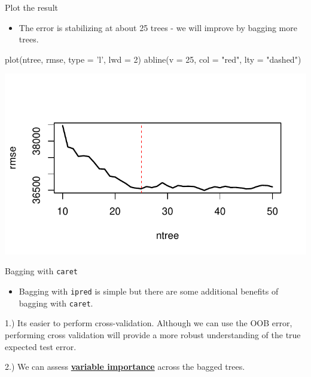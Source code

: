 \documentclass[
  10pt,
  ignorenonframetext,
]{beamer}
\newenvironment{Shaded}{}{}
\newcommand{\DataTypeTok}[1]{#1}
\newcommand{\DecValTok}[1]{#1}
\newcommand{\KeywordTok}[1]{\textcolor[rgb]{0.00,0.00,1.00}{#1}}
\newcommand{\NormalTok}[1]{#1}
\newcommand{\StringTok}[1]{\textcolor[rgb]{0.00,0.50,0.50}{#1}}
\providecommand{\tightlist}{%
  \setlength{\itemsep}{0pt}\setlength{\parskip}{0pt}}
\begin{document}
\begin{frame}[fragile]{Plot the result}
\protect\hypertarget{plot-the-result-1}{}

\begin{itemize}
\tightlist
\item
  The error is stabilizing at about 25 trees - we will improve by
  bagging more trees.
\end{itemize}

\begin{Shaded}
\begin{Highlighting}[]
\KeywordTok{plot}\NormalTok{(ntree, rmse, }\DataTypeTok{type =} \StringTok{'l'}\NormalTok{, }\DataTypeTok{lwd =} \DecValTok{2}\NormalTok{)}
\KeywordTok{abline}\NormalTok{(}\DataTypeTok{v =} \DecValTok{25}\NormalTok{, }\DataTypeTok{col =} \StringTok{"red"}\NormalTok{, }\DataTypeTok{lty =} \StringTok{"dashed"}\NormalTok{)}
\end{Highlighting}
\end{Shaded}

\includegraphics{c1_trees_bagging_files/figure-beamer/unnamed-chunk-26-1.pdf}

\end{frame}

\begin{frame}[fragile]{Bagging with \texttt{caret}}
\protect\hypertarget{bagging-with-caret}{}

\begin{itemize}
\tightlist
\item
  Bagging with \texttt{ipred} is simple but there are some additional
  benefits of bagging with \texttt{caret}.
\end{itemize}

1.) Its easier to perform cross-validation. Although we can use the OOB
error, performing cross validation will provide a more robust
understanding of the true expected test error.

2.) We can assess
\href{https://topepo.github.io/caret/variable-importance.html}{\textbf{variable
importance}} across the bagged trees.

\end{frame}
\end{document}
